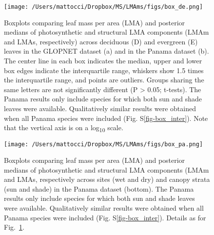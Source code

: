 \documentclass[
  12pt,
  a4paper,
,tablecaptionabove
]{scrartcl}
\begin{document}
\begin{figure}

{\centering \texttt{[image: /Users/mattocci/Dropbox/MS/LMAms/figs/box\_de.png]}

}

\caption{\label{fig-boxplt_de}Boxplots comparing leaf mass per area
(LMA) and posterior medians of photosynthetic and structural LMA
components (LMAm and LMAs, respectively) across deciduous (D) and
evergreen (E) leaves in the GLOPNET dataset (a) and in the Panama
dataset (b). The center line in each box indicates the median, upper and
lower box edges indicate the interquartile range, whiskers show 1.5
times the interquartile range, and points are outliers. Groups sharing
the same letters are not significantly different (P \textgreater{} 0.05;
t-tests). The Panama results only include species for which both sun and
shade leaves were available. Qualitatively similar results were obtained
when all Panama species were included (Fig. S\ref{fig-box_inter}). Note
that the vertical axis is on a log\textsubscript{10} scale.}

\end{figure}

\newpage

\begin{figure}

{\centering \texttt{[image: /Users/mattocci/Dropbox/MS/LMAms/figs/box\_pa.png]}

}

\caption{\label{fig-boxplt_pa}Boxplots comparing leaf mass per area
(LMA) and posterior medians of photosynthetic and structural LMA
components (LMAm and LMAs, respectively across sites (wet and dry) and
canopy strata (sun and shade) in the Panama dataset (bottom). The Panama
results only include species for which both sun and shade leaves were
available. Qualitatively similar results were obtained when all Panama
species were included (Fig. S\ref{fig-box_inter}). Details as for
Fig.~\ref{fig-boxplt_de}.}

\end{figure}

\newpage
\end{document}
